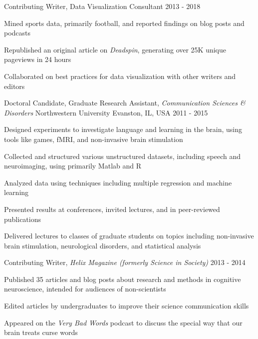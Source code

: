 \begin{cventries}
   \cventry
   {Contributing Writer, Data Visualization Consultant}
   {}
   {}
   {2013 - 2018}
   {
    \begin{cvitems}
    \item {Mined sports data, primarily football, and reported findings on blog posts and podcasts}
    \item {Republished an original article on \textit{Deadspin}, generating over 25K unique pageviews in 24 hours}
    \item {Collaborated on best practices for data visualization with other writers and editors}
    \end{cvitems}
    }
  \cventry
    {Doctoral Candidate, Graduate Research Assistant, \textit{Communication Sciences \& Disorders}} %
    {Northwestern University} %
    {Evanston, IL, USA} %
    {2011 - 2015} %
    {
      \begin{cvitems}
      \item {Designed experiments to investigate language and learning in the brain, using tools like games, fMRI, and non-invasive brain stimulation}
      \item {Collected and structured various unstructured datasets, including speech and neuroimaging, using primarily Matlab and R}
      \item {Analyzed data using techniques including multiple regression and machine learning}
      \item {Presented results at conferences, invited lectures, and in peer-reviewed publications}
      \item {Delivered lectures to classes of graduate students on topics including non-invasive brain stimulation, neurological disorders, and statistical analysis}
      \end{cvitems}
    }
    
   \cventry
    {Contributing Writer, \textit{Helix Magazine (formerly Science in Society)}}
    {}
    {}
    {2013 - 2014}
    {
    \begin{cvitems}
    \item {Published 35 articles and blog posts about research and methods in cognitive neuroscience, intended for audiences of non-scientists}
    \item {Edited articles by undergraduates to improve their science communication skills}
    \item {Appeared on the \textit{Very Bad Words} podcast to discuss the special way that our brain treats curse words}
    \end{cvitems}
    }


\end{cventries}
